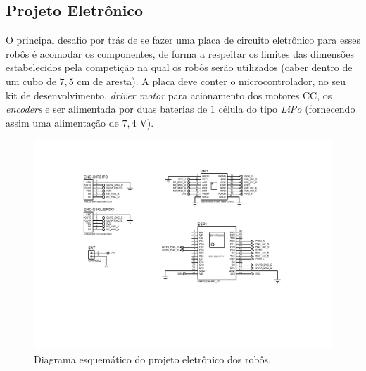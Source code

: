 \subsection{Projeto Eletrônico}
\label{subsec:pro_eletronico}


O principal desafio por trás de se fazer uma placa de circuito eletrônico para esses robôs é acomodar os componentes, de forma a respeitar os limites das dimensões estabelecidos pela competição na qual os robôs serão utilizados (caber dentro de um cubo de $7,5$ cm de aresta). A placa deve conter o microcontrolador, no seu kit de desenvolvimento, \textit{driver motor} para acionamento dos motores CC, os \textit{encoders} e ser alimentada por duas baterias de $1$ célula do tipo \textit{LiPo} (fornecendo assim uma alimentação de $7,4$ V).\\


\begin{figure}[H]
    \centering
    \includegraphics[width=\textwidth]{figuras/eletronica/placa/esquematico_completo.pdf}
    \caption{Diagrama esquemático do projeto eletrônico dos robôs.}
    \label{fig:diagrama_esquematico}
\end{figure}

